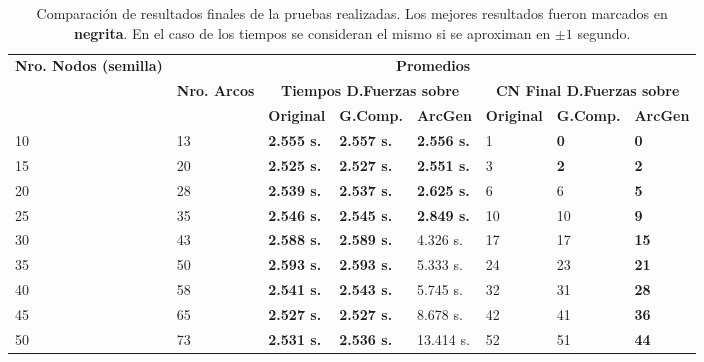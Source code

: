 
\begin{table}
	\caption{Comparación de resultados finales de la pruebas realizadas. Los mejores resultados fueron marcados en \textbf{negrita}. En el caso de los tiempos se consideran el mismo si se aproximan en $\pm1$ segundo.}
	\label{tab:resultados_comparacion}
	\begin{tabularx}{\linewidth}{|X|X|X|X|X|X|X|X|}
		\hline
		\multirow{3}{2cm}{\textbf{Nro. Nodos (semilla)}} & \multicolumn{7}{c|}{\textbf{Promedios}} \\
        \cline{2-8} & \multirow{2}{2cm}{\textbf{Nro. Arcos}} & \multicolumn{3}{c|}{\textbf{Tiempos D.Fuerzas sobre}} & \multicolumn{3}{c|}{\textbf{CN Final D.Fuerzas sobre}} \\
		\cline{3-8} & & \textbf{Original} & \textbf{G.Comp.} & \textbf{ArcGen} & \textbf{Original} & \textbf{G.Comp.} & \textbf{ArcGen} \\
		\hline
		10 & 13 & \textbf{2.555 s.} & \textbf{2.557 s.} & \textbf{2.556 s.} & {1} & \textbf{0} & \textbf{0} \\
		\hline
		15 & 20 & \textbf{2.525 s.} & \textbf{2.527 s.} & \textbf{2.551 s.} & {3} & \textbf{2} & \textbf{2} \\
		\hline
		20 & 28 & \textbf{2.539 s.} & \textbf{2.537 s.} & \textbf{2.625 s.} & {6} & {6} & \textbf{5} \\
		\hline
		25 & 35 & \textbf{2.546 s.} & \textbf{2.545 s.} & \textbf{2.849 s.} & {10} & {10} & \textbf{9} \\
		\hline
		30 & 43 & \textbf{2.588 s.} & \textbf{2.589 s.} & {4.326 s.} & {17} & {17} & \textbf{15} \\
		\hline
		35 & 50 & \textbf{2.593 s.} & \textbf{2.593 s.} & {5.333 s.} & {24} & {23} & \textbf{21} \\
		\hline
		40 & 58 & \textbf{2.541 s.} & \textbf{2.543 s.} & {5.745 s.} & {32} & {31} & \textbf{28} \\
		\hline
		45 & 65 & \textbf{2.527 s.} & \textbf{2.527 s.} & {8.678 s.} & {42} & {41} & \textbf{36} \\
		\hline
		50 & 73 & \textbf{2.531 s.} & \textbf{2.536 s.} & {13.414 s.} & {52} & {51} & \textbf{44} \\
		\hline
	\end{tabularx}
\end{table}


